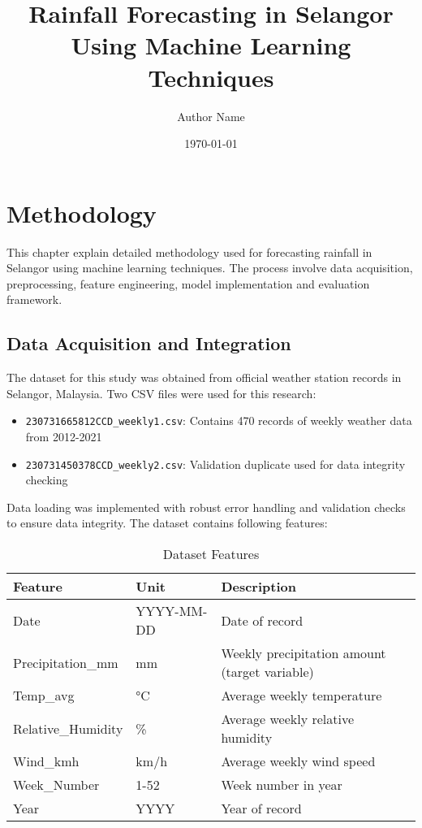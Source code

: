 \documentclass[12pt]{article}
\title{Rainfall Forecasting in Selangor Using Machine Learning Techniques}
\author{Author Name}
\date{\today}
\begin{document}
\chapter{Methodology}
\label{chap:methodology}

This chapter explain detailed methodology used for forecasting rainfall in Selangor using machine learning techniques. The process involve data acquisition, preprocessing, feature engineering, model implementation and evaluation framework.

\section{Data Acquisition and Integration}
\label{sec:data_acquisition}

The dataset for this study was obtained from official weather station records in Selangor, Malaysia. Two CSV files were used for this research:

\begin{itemize}
    \item \texttt{230731665812CCD\_weekly1.csv}: Contains 470 records of weekly weather data from 2012-2021
    \item \texttt{230731450378CCD\_weekly2.csv}: Validation duplicate used for data integrity checking
\end{itemize}

Data loading was implemented with robust error handling and validation checks to ensure data integrity. The dataset contains following features:

\begin{table}[h]
\centering
\caption{Dataset Features}
\label{tab:dataset_features}
\begin{tabular}{|l|l|p{8cm}|}
\hline
\textbf{Feature} & \textbf{Unit} & \textbf{Description} \\
\hline
Date & YYYY-MM-DD & Date of record \\
\hline
Precipitation\_mm & mm & Weekly precipitation amount (target variable) \\
\hline
Temp\_avg & °C & Average weekly temperature \\
\hline
Relative\_Humidity & \% & Average weekly relative humidity \\
\hline
Wind\_kmh & km/h & Average weekly wind speed \\
\hline
Week\_Number & 1-52 & Week number in year \\
\hline
Year & YYYY & Year of record \\
\hline
\end{tabular}
\end{table}
\end{document}
